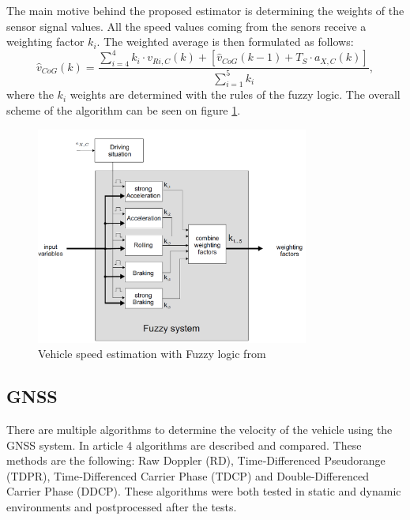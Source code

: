 The main motive behind the proposed estimator is determining the weights of the sensor signal values. All the speed values coming from the senors receive a weighting factor $k_i$. The weighted average is then  formulated as follows:
\begin{equation}
    \hat v_{CoG}(k) = \frac{\sum_{i=4}^4 k_i \cdot v_{Ri,C}(k) + [\hat v_{CoG}(k-1) + T_S\cdot a_{X,C}(k)]}{\sum_{i=1}^5 k_i},
\end{equation}
where the $k_i$ weights are determined with the rules of the fuzzy logic. The overall scheme of the algorithm can be seen on figure \ref{fig:fuzzy_system}.
\FloatBarrier
\begin{figure}[ht]
    \centering
    \includegraphics[width=0.8\textwidth]{images/fuzzy_logic.png}
    \caption{Vehicle speed estimation with Fuzzy logic from \cite{lit_for_Kalman_fuzzy}}
    \label{fig:fuzzy_system}
\end{figure}
\FloatBarrier

\subsection{GNSS}
There are multiple algorithms to determine the velocity of the vehicle using the GNSS system. In article \cite{GNSS_velocity_estimation} 4 algorithms are described and compared. These methods are the following: Raw Doppler (RD), Time‑Differenced Pseudorange (TDPR), Time‑Differenced Carrier Phase (TDCP) and Double‑Differenced Carrier Phase (DDCP). These algorithms were both tested in static and dynamic environments and postprocessed after the tests. 

